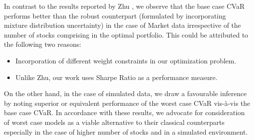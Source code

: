In contrast to the results reported by Zhu \cite{zhu}, we observe that the base case CVaR performs better than the robust counterpart (formulated by incorporating mixture distribution uncertainty) in the case of Market data irrespective of the number of stocks comprising in the optimal portfolio. This could be attributed to the following two reasons:
\begin{itemize}
    \item Incorporation of different weight constraints in our optimization problem.
    \item Unlike Zhu, our work uses Sharpe Ratio as a performance measure.
\end{itemize}
On the other hand, in the case of simulated data, we draw a favourable inference by noting superior or equivalent performance of the worst case CVaR vis-\`a-vis the base case CVaR. In accordance with these results, we advocate for consideration of worst case models as a viable alternative to their classical counterparts especially in the case of higher number of stocks and in a simulated environment.